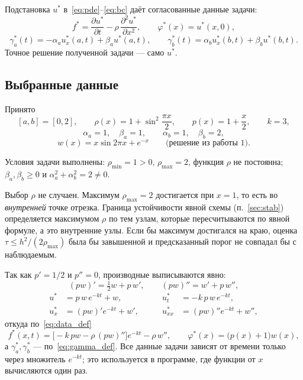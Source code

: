 \documentclass[12pt,a4paper]{article}
\begin{document}
Подстановка $u^*$ в~\eqref{eq:pde}--\eqref{eq:bc} даёт согласованные
данные задачи:
\begin{equation}\label{eq:data_def}
f^*=\frac{\partial u^*}{\partial t}-\rho\,\frac{\partial^2u^*}{\partial x^2},
\qquad
\varphi^*(x)=u^*(x,0),
\end{equation}
\begin{equation}\label{eq:gamma_def}
\gamma_a^*(t)=-\alpha_a u^*_x(a,t)+\beta_a u^*(a,t),\qquad
\gamma_b^*(t)= \alpha_b u^*_x(b,t)+\beta_b u^*(b,t).
\end{equation}
Точное решение полученной задачи --- само $u^*$.

\subsection{Выбранные данные}

Принято
\begin{equation}\label{eq:data}
[a,b]=[0,2],\qquad
\rho(x)=1+\sin^2\frac{\pi x}{2},\qquad
p(x)=1+\frac{x}{2},\qquad k=3,
\end{equation}
\begin{equation}\label{eq:bcdata}
\alpha_a=1,\quad\beta_a=1,\qquad \alpha_b=1,\quad\beta_b=2,
\end{equation}
\begin{equation}\label{eq:w}
w(x)=x\sin2\pi x+e^{-x}\qquad\text{(решение из работы 1).}
\end{equation}

Условия задачи выполнены: $\rho_{\min}=1>0$, $\rho_{\max}=2$, функция
$\rho$ не постоянна; $\beta_a,\beta_b\ge0$ и
$\alpha_a^2+\alpha_b^2=2\neq0$.

Выбор $\rho$ не случаен. Максимум $\rho_{\max}=2$ достигается при $x=1$,
то есть во \emph{внутренней} точке отрезка. Граница устойчивости явной
схемы (п.~\ref{sec:stab}) определяется максимумом $\rho$ по тем узлам,
которые пересчитываются по явной формуле, а это внутренние узлы. Если бы
максимум достигался на краю, оценка $\tau\le h^2/(2\rho_{\max})$ была бы
завышенной и предсказанный порог не совпадал бы с наблюдаемым.

Так как $p'=1/2$ и $p''=0$, производные выписываются явно:
\begin{equation}\label{eq:pw}
(pw)'=\tfrac12 w+p\,w',\qquad (pw)''=w'+p\,w'' ,
\end{equation}
\begin{equation}\label{eq:derivs}
\begin{aligned}
u^*&=p\,w\,e^{-kt}+w, &\qquad
u^*_t&=-k\,p\,w\,e^{-kt},\\
u^*_x&=(pw)'e^{-kt}+w', &\qquad
u^*_{xx}&=(pw)''e^{-kt}+w'' ,
\end{aligned}
\end{equation}
откуда по~\eqref{eq:data_def}
\begin{equation}\label{eq:fstar}
f^*(x,t)=\bigl[-k\,pw-\rho\,(pw)''\bigr]e^{-kt}-\rho\,w'' ,
\qquad
\varphi^*(x)=\bigl(p(x)+1\bigr)w(x),
\end{equation}
а $\gamma^*_a,\gamma^*_b$ --- по~\eqref{eq:gamma_def}. Все данные задачи
зависят от времени только через множитель $e^{-kt}$; это используется в
программе, где функции от $x$ вычисляются один раз.
\end{document}
